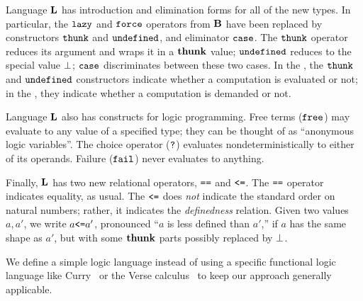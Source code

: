 Language \(\mathbf{L}\) has introduction and elimination forms for all of the new
types. In particular, the \(\texttt{lazy}\) and \(\texttt{force}\) operators from \(\mathbf{B}\)
have been replaced by constructors \(\texttt{thunk}\) and \(\texttt{undefined}\), and
eliminator \(\texttt{case}\). The \(\texttt{thunk}\) operator reduces its argument and wraps
it in a \(\textbf{thunk}\) value; \(\texttt{undefined}\) reduces to the special value
\(\bot\); \(\texttt{case}\) discriminates between these two cases. In the
\transCname{}, the \(\texttt{thunk}\) and \(\texttt{undefined}\) constructors indicate
whether a computation is evaluated or not; in the \transDname, they indicate
whether a computation is demanded or not.

Language \(\mathbf{L}\) also has constructs for logic programming. Free terms
(\(\texttt{free}\)) may evaluate to any value of a specified type; they can be thought
of as ``anonymous logic variables''. The choice operator (\(\texttt{?}\))
evaluates nondeterministically to either of its operands. Failure (\(\texttt{fail}\))
never evaluates to anything.

Finally, \(\mathbf{L}\) has two new relational operators, \(\texttt{==}\) and \(\texttt{<=}\). The
\(\texttt{==}\) operator indicates equality, as usual. The \(\texttt{<=}\) does \emph{not}
indicate the standard order on natural numbers; rather, it indicates the
\emph{definedness} relation. Given two values \(a, a'\), we write \(a \texttt{<=} a'\),
pronounced ``\(a\) is less defined than \(a'\),'' if \(a\) has the same shape as
\(a'\), but with some \(\textbf{thunk}\) parts possibly replaced by \(\bot\).


We define a simple logic language instead of using a specific functional logic
language like Curry~\cite{curry-lang,curry-monadic-semantics} or the Verse
calculus~\cite{verse} to keep our approach generally applicable.

